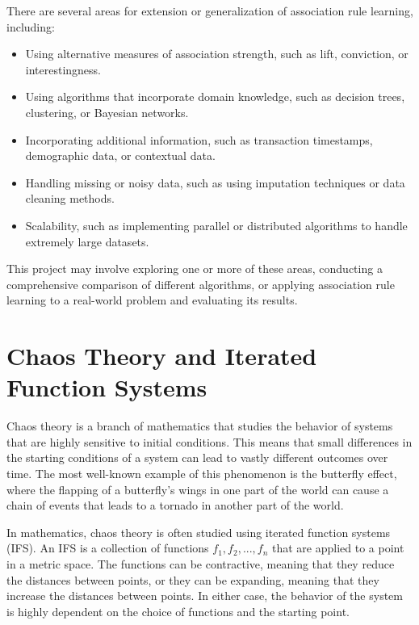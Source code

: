 \documentclass{article}
\begin{document}
    \vspace{3mm}
    There are several areas for extension or generalization of association rule learning, including:
    \begin{itemize}
        \item Using alternative measures of association strength, such as lift, conviction, or interestingness.
        \item Using algorithms that incorporate domain knowledge, such as decision trees, clustering, or Bayesian networks.
        \item Incorporating additional information, such as transaction timestamps, demographic data, or contextual data.
        \item Handling missing or noisy data, such as using imputation techniques or data cleaning methods.
        \item Scalability, such as implementing parallel or distributed algorithms to handle extremely large datasets.
    \end{itemize}
    
    This project may involve exploring one or more of these areas, conducting a comprehensive comparison of different algorithms, or applying association rule learning to a real-world problem and evaluating its results.

\pagebreak

\section{Chaos Theory and Iterated Function Systems}
    Chaos theory is a branch of mathematics that studies the behavior of systems that are highly sensitive to initial conditions. This means that small differences in the starting conditions of a system can lead to vastly different outcomes over time. The most well-known example of this phenomenon is the butterfly effect, where the flapping of a butterfly's wings in one part of the world can cause a chain of events that leads to a tornado in another part of the world.
    
    \vspace{3mm}
    In mathematics, chaos theory is often studied using iterated function systems (IFS). An IFS is a collection of functions $f_1, f_2, ..., f_n$ that are applied to a point in a metric space. The functions can be contractive, meaning that they reduce the distances between points, or they can be expanding, meaning that they increase the distances between points. In either case, the behavior of the system is highly dependent on the choice of functions and the starting point.
    
\end{document}
